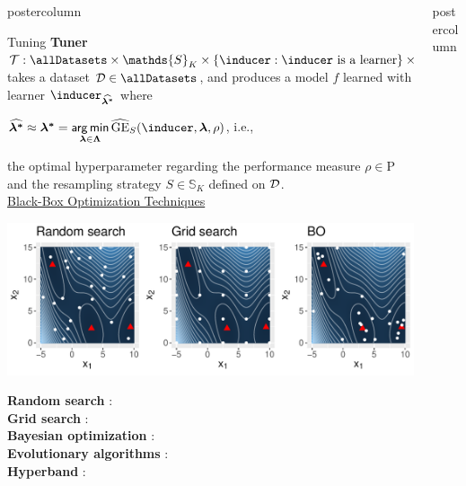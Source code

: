 \documentclass{beamer}
\newlength{\columnheight} %
\begin{document}
\begin{frame}[fragile]{}
\begin{columns}
\begin{column}{.31\textwidth}
\begin{beamercolorbox}[center]{postercolumn}
\begin{minipage}{.98\textwidth}
{\begin{myblock}{Tuning}
\textbf{Tuner} $\mathcal{T}: \allDatasets \times \mathds{S}_K \times \{\inducer: \inducer \textrm{ is a learner}\} \times \mathrm{P} \rightarrow \Hspace$ takes a dataset $\D \in \allDatasets$, and produces a model $f$ learned with learner $\inducer_{\boldsymbol{\widehat{\lambda^*}}}$ where
\begin{center}$\boldsymbol{\widehat{\lambda^*}} \approx \boldsymbol{\lambda^*} = \argmin \limits_{\boldsymbol{\lambda} \in \bm{\Lambda}} \widehat{\mathrm{GE}}_S(\inducer, \boldsymbol\lambda, \rho)$, i.e.,\end{center} the optimal hyperparameter regarding the performance measure $\rho \in \mathrm{P}$ and the resampling strategy $S \in \mathds{S}_K$ defined on $\mathcal{D}$.\\

\underline{Black-Box Optimization Techniques}\\

 \begin{center}
             \includegraphics[width=0.95\columnwidth]{figure/bb_cmp.pdf}
               \end{center}
\textbf{Random search} : \\

\textbf{Grid search} : \\ 

\textbf{Bayesian optimization} : \\

\textbf{Evolutionary algorithms} : \\

\textbf{Hyperband} : \\

\end{myblock}



				}
			\end{minipage}
		\end{beamercolorbox}
	\end{column}
	\begin{column}{.31\textwidth}
		\begin{beamercolorbox}[center]{postercolumn}
			\begin{minipage}{.98\textwidth}
				\parbox[t][\columnheight]{\textwidth}{


}
\end{minipage}
\end{beamercolorbox}
\end{column}
\end{columns}
\end{frame}
\end{document}
